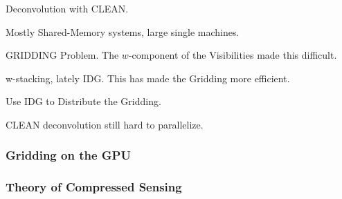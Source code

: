 Deconvolution with CLEAN.

Mostly Shared-Memory systems, large single machines.

GRIDDING Problem. The $w$-component of the Visibilities made this difficult. 

w-stacking, lately IDG. This has made the Gridding more efficient.

Use IDG to Distribute the Gridding.




CLEAN deconvolution still hard to parallelize.


\subsubsection{Gridding on the GPU}

\subsubsection{Theory of Compressed Sensing}












